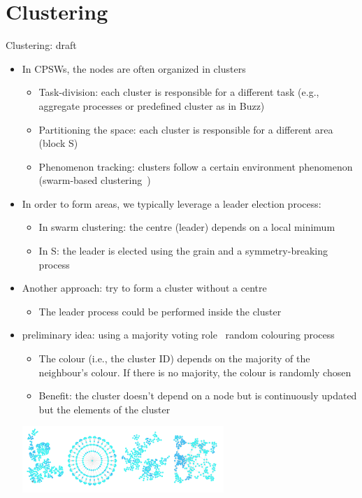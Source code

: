 \documentclass[presentation, 9pt]{beamer}\mode<presentation>{\usetheme{AMSBolognaFC}}
\begin{document}
\section{Clustering}
\begin{frame}{Clustering: draft}
\begin{itemize}
	\item In CPSWs, the nodes are often organized in clusters
	\begin{itemize}
		\item Task-division: each cluster is responsible for a different task (e.g., aggregate processes or predefined cluster as in Buzz)
		\item Partitioning the space: each cluster is responsible for a different area (block S)
		\item Phenomenon tracking: clusters follow a certain environment phenomenon	(swarm-based clustering~\scite{})
	\end{itemize}
	\item In order to form areas, we typically leverage a leader election process:
	\begin{itemize}
		\item In swarm clustering: the centre (leader) depends on a local minimum
		\item In S: the leader is elected using the grain and a symmetry-breaking process
	\end{itemize}
	\item Another approach: try to form a cluster without a centre
	\begin{itemize}
		\item The leader process could be performed inside the cluster
	\end{itemize}
	\item preliminary idea: using a majority voting role \faPlus \, random colouring process
	\begin{itemize}
		\item The colour (i.e., the cluster ID) depends on the majority of the neighbour's colour. If there is no majority, the colour is randomly chosen
		\item Benefit: the cluster doesn't depend on a node but is continuously updated but the elements of the cluster
	\end{itemize}
	\centering
	\includegraphics[width=0.6\textwidth]{img/clustering.png}
\end{itemize}
\end{frame}
\end{document}
